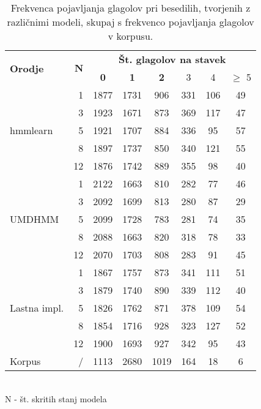\begin{table}
\begin{minipage}{\textwidth}
\centering
\begin{tabular}{|l|r|c|c|c|c|c|c|}
  \hline
  \multirow{2}{*}{\bf Orodje} & \multirow{2}{*}{$\mathbf{N}$} & \multicolumn{6}{|c|}{\bf Št. glagolov na stavek} \\
  \cline{3-8} &  & {\bf 0} & {\bf 1} & {\bf 2} & {\bf} 3 & {\bf} 4 & {\bf} $\geq$ 5 \\
  \hline\multirow{5}{*}{hmmlearn} %
         &    1     & 1877 &  1731 &  906 & 331 & 106 & 49 \\
         &    3     & 1923 &  1671 &  873 & 369 & 117 & 47 \\
         &    5     & 1921 &  1707 &  884 & 336 &  95 & 57 \\
         &    8     & 1897 &  1737 &  850 & 340 & 121 & 55 \\
         &   12     & 1876 &  1742 &  889 & 355 &  98 & 40 \\
  \hline\multirow{5}{*}{UMDHMM} %
         &    1     & 2122 &  1663 &  810 & 282 &  77 & 46 \\
         &    3     & 2092 &  1699 &  813 & 280 &  87 & 29 \\
         &    5     & 2099 &  1728 &  783 & 281 &  74 & 35 \\
         &    8     & 2088 &  1663 &  820 & 318 &  78 & 33 \\
         &   12     & 2070 &  1703 &  808 & 283 &  91 & 45 \\
  \hline\multirow{5}{*}{Lastna impl.} %
         &    1     & 1867 &  1757 &  873 & 341 & 111 & 51 \\
         &    3     & 1879 &  1740 &  890 & 339 & 112 & 40 \\
         &    5     & 1826 &  1762 &  871 & 378 & 109 & 54 \\
         &    8     & 1854 &  1716 &  928 & 323 & 127 & 52 \\
         &   12     & 1900 &  1693 &  927 & 342 &  95 & 43 \\
  \hline
  Korpus &    /     & 1113 &  2680 & 1019 & 164 &  18 &  6 \\
  \hline
\end{tabular}
\\ {\centering N - št. skritih stanj modela}
\caption{Frekvenca pojavljanja glagolov pri besedilih, tvorjenih z različnimi
  modeli, skupaj s frekvenco pojavljanja glagolov v korpusu.}
\label{tab:bench:measurements}
\end{minipage}
\end{table}
